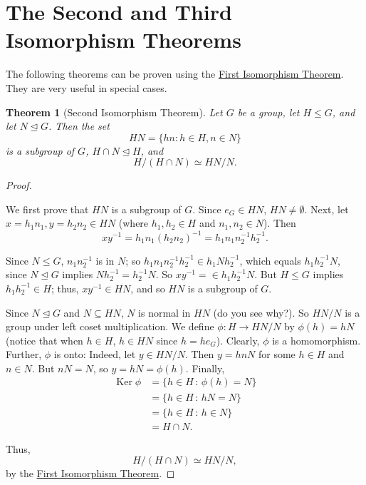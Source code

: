 \documentclass[10pt,]{book}
\theoremstyle{plain}
\newtheorem{theorem}{Theorem}[section]
\theoremstyle{definition}
\theoremstyle{definition}
\theoremstyle{definition}
\theoremstyle{definition}
\numberwithin{equation}{section}
\DeclareMathOperator{\Ker}{Ker}
\newcommand{\amp}{&}
\begin{document}
\section[{The Second and Third Isomorphism Theorems}]{The Second and Third Isomorphism Theorems}\label{section-29}
The following theorems can be proven using the \hyperref[fit]{First Isomorphism Theorem}. They are very useful in special cases.%
\begin{theorem}[{Second Isomorphism Theorem}]\label{sit}
Let \(G\) be a group, let \(H\leq G\), and let \(N\unlhd G\). Then the set%
\begin{equation*}
HN=\{hn:h\in H, n\in N\}
\end{equation*}
is a subgroup of \(G\), \(H\cap N\unlhd H\), and%
\begin{equation*}
H/(H\cap N) \simeq
HN/N.
\end{equation*}
%
\end{theorem}
\begin{proof}\hypertarget{proof-59}{}
We first prove that \(HN\) is a subgroup of \(G\). Since \(e_G\in
HN\), \(HN\neq \emptyset\). Next, let \(x=h_1n_1, y=h_2n_2\in HN\) (where \(h_1,h_2\in H\) and \(n_1,n_2\in N\)). Then%
\begin{equation*}
xy^{-1}=h_1n_1(h_2n_2)^{-1}=h_1n_1n_2^{-1}h_2^{-1}.
\end{equation*}
%
\par
Since \(N\leq G\), \(n_1n_2^{-1}\) is in \(N\); so \(h_1n_1n_2^{-1}h_2^{-1}\in
h_1Nh_2^{-1}\), which equals \(h_1h_2^{-1}N\), since \(N\unlhd G\) implies \(Nh_2^{-1}=h_2^{-1}N\). So \(xy^{-1}=\in h_1h_2^{-1}N.\) But \(H\leq G\) implies \(h_1h_2^{-1}\in H\); thus, \(xy^{-1}\in HN\), and so \(HN\) is a subgroup of \(G\).%
\par
Since \(N\unlhd G\) and \(N\subseteq HN\), \(N\) is normal in \(HN\) (do you see why?). So \(HN/N\) is a group under left coset multiplication. We define \(\phi: H\to HN/N\) by \(\phi(h)=hN\) (notice that when \(h\in H\), \(h\in HN\) since \(h=he_G\)). Clearly, \(\phi\) is a homomorphism. Further, \(\phi\) is onto: Indeed, let \(y\in HN/N\). Then \(y=hnN\) for some \(h\in H\) and \(n\in N\). But \(nN=N\), so \(y=hN=\phi(h)\). Finally,%
\begin{align*}
\Ker \phi\amp =\{h\in H\,:\, \phi(h)=N\}\\
\amp =\{h\in H\,:\, hN=N\}\\
\amp =\{h\in
H\,:\, h\in N\}\\
\amp =H\cap N.
\end{align*}
%
\par
Thus,%
\begin{equation*}
H/(H\cap N)
\simeq HN/N,
\end{equation*}
by the \hyperref[fit]{First Isomorphism Theorem}.%
\end{proof}
\end{document}
